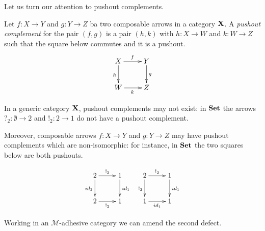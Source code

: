 \documentclass[a4paper,UKenglish,cleveref,pdftex, thm-restate,numberwithinsect]{lipics}
\newcommand{\id}[1]{\mathsf{id}_{#1}}
\def\X{\textbf {\textup{X}}}
\def\Set{\textbf {\textup{Set}}}
\begin{document}
Let us turn our attention to pushout complements.

\begin{definition}
Let $f\colon X\to Y$ and $g\colon Y\to Z$ ba two composable arrows in a category $\X$. A \emph{pushout complement} for the pair $(f,g)$ is a pair $(h,k)$ with $h\colon X\to W$ and $k\colon W\to Z$ such that the square below commutes and it is a pushout.
\[\xymatrix{X \ar[r]^{f} \ar[d]_{h}& Y \ar[d]^{g} \\ W \ar[r]_{k}& Z}\]
\end{definition}

\begin{example}
	In a generic category $\X$, pushout complements may not exist: in $\Set$ the arrows $?_{2}\colon \emptyset \to 2$ and $!_2\colon 2\to 1$ do not have a pushout complement.
	
	Moreover, composable arrows $f\colon X\to Y$ and $g\colon Y\to Z$ may have  pushout complements which are non-isomorphic: for instance, in $\Set$ the two squares below are both pushouts.
	
	\[\xymatrix{2 \ar[r]^{!_2} \ar[d]_{\id{2}}& 1 \ar[d]^{\id{1}} & 2 \ar[r]^{!_2} \ar[d]_{!_2}& 1 \ar[d]^{\id{1}}\\ 2 \ar[r]_{!_2}& 1 & 1 \ar[r]_{\id{1}}& 1}\]
\end{example}

Working in an $\mathcal{M}$-adhesive category we can amend the second defect. 
\end{document}
